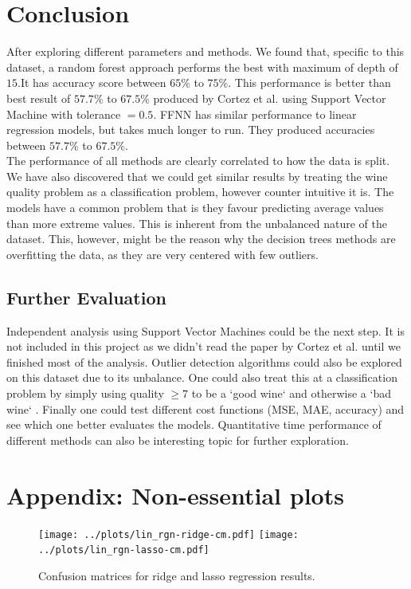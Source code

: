 \documentclass[english,notitlepage,reprint,nofootinbib]{revtex4-1}
\begin{document}
\section{Conclusion}\label{sec:conclusion}
After exploring different parameters and methods. We found that, specific to this dataset, a random forest approach performs the best with maximum of depth of $ 15 $.It has accuracy score between $ 65\% $ to $ 75\% $. This performance is better than best result of $ 57.7\% $ to $ 67.5\% $ produced by Cortez et al. using Support Vector Machine with tolerance $ =0.5 $. \cite{CORTEZ2009547} FFNN has similar performance to linear regression models, but takes much longer to run. They produced accuracies between $57.7\%$ to $67.5\%$. \\
The performance of all methods are clearly correlated to how the data is split. We have also discovered that we could get similar results by treating the wine quality problem as a classification problem, however counter intuitive it is. The models have a common problem that is they favour predicting average values than more extreme values. This is inherent from the unbalanced nature of the dataset. This, however, might be the reason why the decision trees methods are overfitting the data, as they are very centered with few outliers.


\subsection{Further Evaluation}\label{sec:evaluation}
Independent analysis using Support Vector Machines could be the next step. It is not included in this project as we didn't read the paper by Cortez et al. \cite{CORTEZ2009547} until we finished most of the analysis. Outlier detection algorithms could also be explored on this dataset due to its unbalance. One could also treat this at a classification problem by simply using quality $ \ge 7 $ to be a `good wine` and otherwise a `bad wine` \cite{learning_2017}. Finally one could test different cost functions (MSE, MAE, accuracy) and see which one better evaluates the models. Quantitative time performance of different methods can also be interesting topic for further exploration.

\section{Appendix: Non-essential plots}
\begin{figure}[ht]
	\centering
	\texttt{[image: ../plots/lin\_rgn-ridge-cm.pdf]}
	\texttt{[image: ../plots/lin\_rgn-lasso-cm.pdf]}
	\caption{Confusion matrices for ridge and lasso regression results.}
	\label{fig:ridge-lasso-cm}
\end{figure}


\onecolumngrid

%

\end{document}
